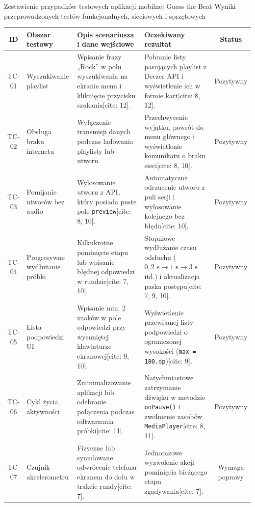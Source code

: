 \begin{tabela}
	{Zestawienie przypadków testowych aplikacji mobilnej Guess the Beat}
	{Wyniki przeprowadzonych testów funkcjonalnych, sieciowych i sprzętowych}
	{
		\begin{tabular}{|c|p{3.5cm}|p{5.0cm}|p{3.0cm}|c|} \hline
			\textbf{ID} & \textbf{Obszar testowy} & \textbf{Opis scenariusza i dane wejściowe} & \textbf{Oczekiwany rezultat} & \textbf{Status} \\ \hline
			TC-01 & Wyszukiwanie playlist & Wpisanie frazy „Rock” w polu wyszukiwania na ekranie menu i kliknięcie przycisku szukania[cite: 12]. & Pobranie listy pasujących playlist z Deezer API i wyświetlenie ich w formie kart[cite: 8, 12]. & Pozytywny \\ \hline
			TC-02 & Obsługa braku internetu & Wyłączenie transmisji danych podczas ładowania playlisty lub utworu. & Przechwycenie wyjątku, powrót do menu głównego i wyświetlenie komunikatu o braku sieci[cite: 8, 10]. & Pozytywny \\ \hline
			TC-03 & Pomijanie utworów bez audio & Wylosowanie utworu z API, który posiada puste pole \texttt{preview}[cite: 8, 10]. & Automatyczne odrzucenie utworu z puli sesji i wylosowanie kolejnego bez błędu[cite: 10]. & Pozytywny \\ \hline
			TC-04 & Progresywne wydłużanie próbki & Kilkukrotne pominięcie etapu lub wpisanie błędnej odpowiedzi w rundzie[cite: 7, 10]. & Stopniowe wydłużanie czasu odsłuchu ($0,2\text{ s} \rightarrow 1\text{ s} \rightarrow 3\text{ s}$ itd.) i aktualizacja paska postępu[cite: 7, 9, 10]. & Pozytywny \\ \hline
			TC-05 & Lista podpowiedzi UI & Wpisanie min. 2 znaków w pole odpowiedzi przy wysuniętej klawiaturze ekranowej[cite: 9, 10]. & Wyświetlenie przewijanej listy podpowiedzi o ograniczonej wysokości (\texttt{max = 180.dp})[cite: 9]. & Pozytywny \\ \hline
			TC-06 & Cykl życia aktywności & Zminimalizowanie aplikacji lub odebranie połączenia podczas odtwarzania próbki[cite: 11]. & Natychmiastowe zatrzymanie dźwięku w metodzie \texttt{onPause()} i zwolnienie zasobów \texttt{MediaPlayer}[cite: 8, 11]. & Pozytywny \\ \hline
			TC-07 & Czujnik akcelerometru & Fizyczne lub symulowane odwrócenie telefonu ekranem do dołu w trakcie rundy[cite: 7]. & Jednorazowe wyzwolenie akcji pominięcia bieżącego etapu zgadywania[cite: 7]. & Wymaga poprawy \\ \hline
		\end{tabular}
	}
	\label{tab:testy}
\end{tabela}

